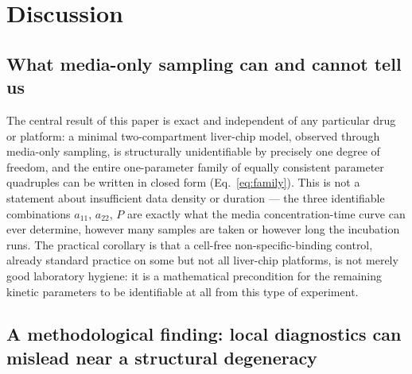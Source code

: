 \section*{Discussion}

\subsection*{What media-only sampling can and cannot tell us}

The central result of this paper is exact and independent of any particular drug or platform: a minimal two-compartment liver-chip model, observed through media-only sampling, is structurally unidentifiable by precisely one degree of freedom, and the entire one-parameter family of equally consistent parameter quadruples can be written in closed form (Eq.~\eqref{eq:family}). This is not a statement about insufficient data density or duration --- the three identifiable combinations $a_{11}$, $a_{22}$, $P$ are exactly what the media concentration-time curve can ever determine, however many samples are taken or however long the incubation runs. The practical corollary is that a cell-free non-specific-binding control, already standard practice on some but not all liver-chip platforms, is not merely good laboratory hygiene: it is a mathematical precondition for the remaining kinetic parameters to be identifiable at all from this type of experiment.

\subsection*{A methodological finding: local diagnostics can mislead near a structural degeneracy}

